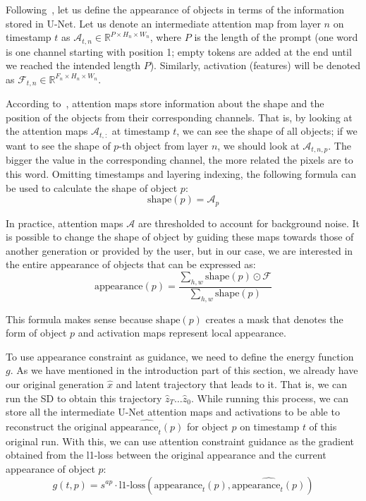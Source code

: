 Following~\cite{aibek}, let us define the appearance of objects in terms of the information stored in U-Net.
Let us denote an intermediate attention map from layer $n$ on timestamp $t$ as $\mathcal{A}_{t,n} \in \mathbb{R}^{P \times H_n\times W_n}$, where $P$ is the length of the prompt (one word is one channel starting with position 1; empty tokens are added at the end until we reached the intended length $P$).
Similarly, activation (features) will be denoted as $\mathcal{F}_{t,n}\in \mathbb{R}^{F_n\times H_n\times W_n}$.

According to~\cite{att_replace_silver_robots}, attention maps store information about the shape and the position of the objects from their corresponding channels.
That is, by looking at the attention maps $\mathcal{A}_{t,:}$ at timestamp $t$, we can see the shape of all objects; if we want to see the shape of $p$-th object from layer $n$, we should look at $\mathcal{A}_{t,n,p}$.
The bigger the value in the corresponding channel, the more related the pixels are to this word.
Omitting timestamps and layering indexing, the following formula can be used to calculate the shape of object $p$:
$$\text{shape}(p) = \mathcal{A}_p$$

In practice, attention maps $\mathcal{A}$ are thresholded to account for background noise. 
It is possible to change the shape of object by guiding these maps towards those of another generation or provided by the user, but in our case, we are interested in the entire appearance of objects that can be expressed as:
$$\text{appearance}(p) = \dfrac{\sum_{h,w}\text{shape}(p)\odot \mathcal{F}}{\sum_{h,w}\text{shape}(p)}$$

This formula makes sense because $\text{shape}(p)$ creates a mask that denotes the form of object $p$ and activation maps represent local appearance.

To use appearance constraint as guidance, we need to define the energy function $g$.
As we have mentioned in the introduction part of this section, we already have our original generation $\hat{x}$ and latent trajectory that leads to it. 
That is, we can run the SD to obtain this trajectory $\hat{z}_T\ldots\hat{z}_0$.
While running this process, we can store all the intermediate U-Net attention maps and activations to be able to reconstruct the original $\widehat{\text{appearance}_t(p)}$ for object $p$ on timestamp $t$ of this original run.
With this, we can use attention constraint guidance as the gradient obtained from the l1-loss between the original appearance and the current appearance of object $p$:
$$g(t, p) = s^{ap}\cdot \text{l1-loss}(\text{appearance}_t(p), \widehat{\text{appearance}_t(p)})$$

